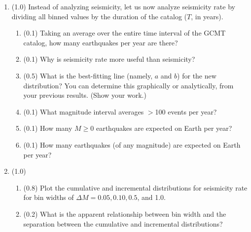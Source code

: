 \documentclass[11pt,titlepage,fleqn]{article}
\newcommand{\fmag}{frequency--magnitude}
\begin{document}
\begin{enumerate}
\begin{enumerate}
Hint: Where does $N = 1$ intersect your best-fitting line?

Note: The expected value does not have to agree with what actually occurred within the GCMT catalog.


\item (0.2) The ``catalog completeness'' \citep[\eg][]{WiemerWyss2000} $M_c$ represents the smallest magnitude above which the \fmag\ distribution is representative for a particular seismicity catalog. What is the catalog completeness for GCMT? List your answer with 0.1 precision. (Provide a brief explanation, but no computation is necessary.)

\end{enumerate}


\item (1.0) Instead of analyzing seismicity, let us now analyze seismicity rate by dividing all binned values by the duration of the catalog ($T$, in years).
%
\begin{enumerate}
\item (0.1) Taking an average over the entire time interval of the GCMT catalog, how many earthquakes per year are there?

\item (0.1) Why is seismicity rate more useful than seismicity?

\item (0.5) What is the best-fitting line (namely, $a$ and $b$) for the new distribution?
You can determine this graphically or analytically, from your previous results.
(Show your work.)

\item (0.1) What magnitude interval averages $>$100 events per year?

\item (0.1) How many $M \ge 0$ earthquakes are expected on Earth per year?

\item (0.1) How many earthquakes (of any magnitude) are expected on Earth per year?
\end{enumerate}


\item (1.0)
%
\begin{enumerate}
\item (0.8) Plot the cumulative and incremental distributions for seismicity rate for bin widths of $\Delta M = 0.05, 0.10, 0.5$, and 1.0.
\item (0.2) What is the apparent relationship between bin width and the separation between the cumulative and incremental distributions?
\end{enumerate}


\end{enumerate}
\end{document}
